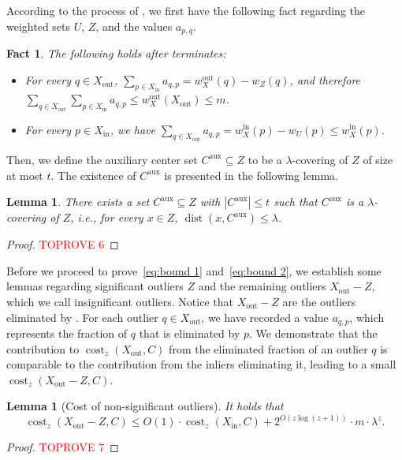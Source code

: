 \documentclass[letterpaper,11pt]{article}
\theoremstyle{plain}
\newtheorem{lemma}[theorem]{Lemma}
\newtheorem{fact}[theorem]{Fact}
\theoremstyle{definition}
\theoremstyle{remark}
\DeclareMathOperator{\cost}{cost}
\DeclareMathOperator{\dist}{dist}
\newcommand{\inl}{\mathrm{in}}
\newcommand{\out}{\mathrm{out}}
\newcommand{\aux}{\mathrm{aux}}
\begin{document}
According to the process of , we first have the following fact regarding the weighted sets $U$, $Z$, and the values $a_{p,q}$.
\begin{fact}
    \label{fact:UZ}
    The following holds after  terminates:
    \begin{itemize}
        \item [1.] For every $q\in X_\out$, $\sum_{p\in X_\inl} a_{q,p} = w_X^\out(q) - w_Z(q)$, and therefore $\sum_{q\in X_\out}\sum_{p\in X_\inl} a_{q,p} \le w_X^\out(X_\out)\le m$.
        \item [2.] For every $p\in X_\inl$, we have $\sum_{q\in X_\out} a_{q,p} = w_X^\inl(p) - w_U(p)\le w_X^{\inl}(p)$. 
    \end{itemize}
\end{fact}

Then, we define the auxiliary center set $C^\aux\subseteq Z$ to be a $\lambda$-covering of $Z$ of size at most $t$. The existence of $C^\aux$ is presented in the following lemma.

\begin{lemma}
    \label{claim:bounded size of Caux}
    There exists a set $C^\aux\subseteq Z$ with $|C^\aux|\le t$ such that $C^\aux$ is a $\lambda$-covering of $Z$, i.e., for every $x\in Z$, $\dist(x,C^\aux)\le \lambda$.
\end{lemma}
\begin{proof}\textcolor{red}{TOPROVE 6}\end{proof}







Before we proceed to prove~\eqref{eq:bound 1} and~\eqref{eq:bound 2}, we establish some lemmas regarding significant outliers $Z$ and the remaining outliers $X_\out - Z$, which we call insignificant outliers.
Notice that $X_\out-Z$ are the outliers eliminated by . For each outlier $q\in X_\out$, we have recorded a value $a_{q,p}$, which represents the fraction of $q$ that is eliminated by $p$. We demonstrate that the contribution to $\cost_z(X_\out,C)$ from the eliminated fraction of an outlier $q$ is comparable to the contribution from the inliers eliminating it, leading to a small $\cost_z(X_\out - Z,C)$.





\begin{lemma}[Cost of non-significant outliers]
    \label{lem:for non-significant}
    It holds that
    \begin{equation*}
        \cost_z(X_\out - Z,C)\le O(1)\cdot \cost_z(X_\inl,C) + 2^{O(z\log(z+1))}\cdot m\cdot \lambda^z.
    \end{equation*}
\end{lemma}
\begin{proof}\textcolor{red}{TOPROVE 7}\end{proof}
\end{document}
